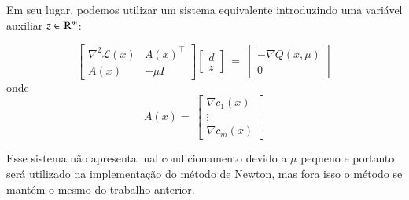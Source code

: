     \newpage
    Em seu lugar, podemos utilizar um sistema equivalente introduzindo uma variável
    auxiliar $z \in \varmathbb{R}^m$:

    \begin{equation*}
        \begin{bmatrix}
            \nabla^2 \mathcal{L}(x) & A(x)^\top \\
            A(x) & -\mu I
        \end{bmatrix}
        \begin{bmatrix}
            d \\
            z
        \end{bmatrix} \
        = \
        \begin{bmatrix}
            -\nabla Q(x, \mu) \\
            0
        \end{bmatrix}
    \end{equation*}
    onde
    \begin{equation*}
        A(x) = \
        \begin{bmatrix}
            \nabla c_1(x) \\
            \vdots \\
            \nabla c_m(x)
        \end{bmatrix}
    \end{equation*}

    Esse sistema não apresenta mal condicionamento devido a
    $\mu$ pequeno e portanto será utilizado na implementação do método de Newton,
    mas fora isso o método se mantém o mesmo do trabalho anterior.
